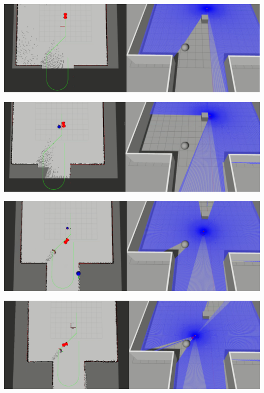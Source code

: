\begin{center}
    \includegraphics[width=\textwidth]{figures/raw/local_planner_test_curved_traj_2_static_objects_1.png}

    \vspace{0.5cm}
    \includegraphics[width=\textwidth]{figures/raw/local_planner_test_curved_traj_2_static_objects_2.png}

    \vspace{0.5cm}
    \includegraphics[width=\textwidth]{figures/raw/local_planner_test_curved_traj_2_static_objects_3.png}

    \vspace{0.5cm}
    \includegraphics[width=\textwidth]{figures/raw/local_planner_test_curved_traj_2_static_objects_4.png}


\end{center}
